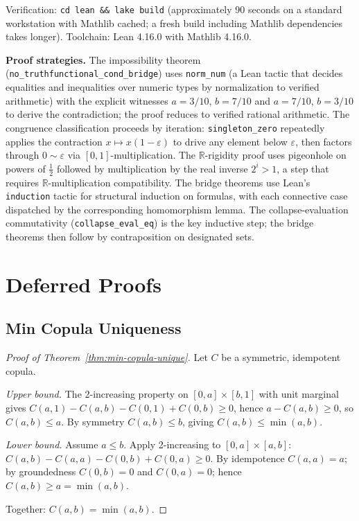 \documentclass[11pt,a4paper]{article}
\newcommand{\Real}{\mathbb{R}}
\begin{document}
Verification: \texttt{cd lean \&\& lake build}
(approximately 90 seconds on a standard workstation with Mathlib
cached; a fresh build including Mathlib dependencies takes longer).
Toolchain: Lean 4.16.0 with Mathlib 4.16.0.

\textbf{Proof strategies.}
The impossibility theorem
(\texttt{no\_truthfunctional\_cond\_bridge}) uses
\texttt{norm\_num}
(a Lean tactic that decides equalities and inequalities over numeric
types by normalization to verified arithmetic)
with the explicit witnesses
$a = 3/10$, $b = 7/10$ and $a = 7/10$, $b = 3/10$ to derive the
contradiction; the proof reduces to verified rational arithmetic.
The congruence classification proceeds by iteration:
\texttt{singleton\_zero} repeatedly applies the contraction
$x \mapsto x(1 - \varepsilon)$ to drive any element below
$\varepsilon$, then factors through $0 \sim \varepsilon$ via
$[0,1]$-multiplication.
The $\Real$-rigidity proof uses pigeonhole on powers of
$\tfrac{1}{2}$ followed by multiplication by the real inverse
$2^i > 1$, a step that requires $\Real$-multiplication
compatibility.
The bridge theorems use Lean's \texttt{induction} tactic for
structural induction on formulas, with each connective case
dispatched by the corresponding homomorphism lemma.
The collapse-evaluation commutativity
(\texttt{collapse\_eval\_eq}) is the key inductive step; the
bridge theorems then follow by contraposition on designated sets.

\section{Deferred Proofs}
\label{app:proofs}

\subsection{Min Copula Uniqueness}

\begin{proof}[Proof of Theorem~\ref{thm:min-copula-unique}]
Let $C$ be a symmetric, idempotent copula.

\emph{Upper bound.}
The 2-increasing property on $[0,a] \times [b,1]$ with unit
marginal gives
$C(a,1) - C(a,b) - C(0,1) + C(0,b) \geq 0$, hence
$a - C(a,b) \geq 0$, so $C(a,b) \leq a$.
By symmetry $C(a,b) \leq b$, giving $C(a,b) \leq \min(a,b)$.

\emph{Lower bound.}
Assume $a \leq b$.
Apply 2-increasing to $[0,a] \times [a,b]$:
$C(a,b) - C(a,a) - C(0,b) + C(0,a) \geq 0$.
By idempotence $C(a,a) = a$; by groundedness $C(0,b) = 0$
and $C(0,a) = 0$; hence $C(a,b) \geq a = \min(a,b)$.

Together: $C(a,b) = \min(a,b)$.
\end{proof}
\end{document}
